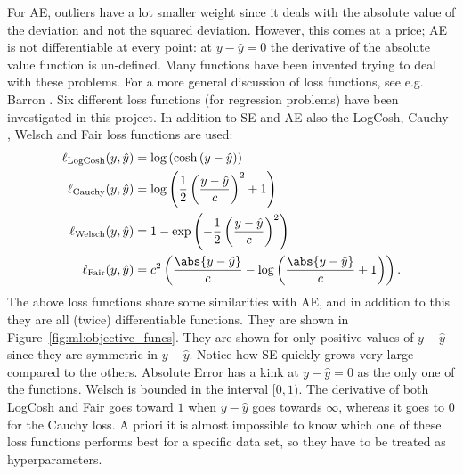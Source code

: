 For AE, outliers have a lot smaller weight since it deals with the absolute value of the deviation and not the squared deviation. However, this comes at a price; AE is not differentiable at every point: at $y-\hat{y} = 0$ the derivative of the absolute value function is un-defined. Many functions have been invented trying to deal with these problems. For a more general discussion of loss functions, see e.g. Barron \citep{barronGeneralAdaptiveRobust2017}. Six different loss functions (for regression problems) have been investigated in this project. In addition to SE and AE also the LogCosh, Cauchy  \citep{barronGeneralAdaptiveRobust2017}, Welsch  \citep{barronGeneralAdaptiveRobust2017} and Fair  \citep{AllstateClaimsSeverity} loss functions are used:
\begin{equation}
  \begin{split}
    \ell_\mathrm{LogCosh}(y, \hat{y})  &= \log\left( \cosh\left( y-\hat{y} \right) \right) \\
    \ell_\mathrm{Cauchy}(y, \hat{y})  &= \log\left( \frac{1}{2} \left(\frac{y-\hat{y}}{c}\right)^2 + 1   \right) \\
    \ell_\mathrm{Welsch}(y, \hat{y})  &=  1 - \exp\left( - \frac{1}{2} \left(\frac{y-\hat{y}}{c}\right)^2  \right)\\
    \ell_\mathrm{Fair}(y, \hat{y})  &= c^2  \left( \frac{\abs{y-\hat{y}} }{c}  - \log \left(\frac{\abs{y-\hat{y}}}{c} +1 \right )   \right). 
  \end{split}
\end{equation}
The above loss functions share some similarities with AE, and in addition to this they are all (twice) differentiable functions. They are shown in Figure~\ref{fig:ml:objective_funcs}. They are shown for only positive values of $y-\hat{y}$ since they are symmetric in $y-\hat{y}$. Notice how SE quickly grows very large compared to the others. Absolute Error has a kink at $y-\hat{y}=0$ as the only one of the functions. Welsch is bounded in the interval $[0, 1)$. The derivative of both LogCosh and Fair goes toward $1$ when $y-\hat{y}$ goes towards $\infty$, whereas it goes to 0 for the Cauchy loss. A priori it is almost impossible to know which one of these loss functions performs best for a specific data set, so they have to be treated as hyperparameters. 

